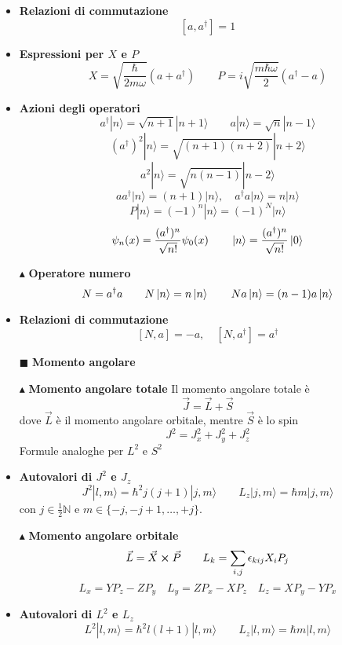 \documentclass{book}
\newcommand{\g}{\textbf}
\newcommand{\e}{\begin{equation}}
\newcommand{\ex}{\end{equation} }
\renewcommand{\it}{\item[$\cdot$]}
\begin{document}
\begin{multicols}{4}
\begin{itemize}
    \it \g{Relazioni di commutazione}
        \e{[a, a^\dagger] = 1} \ex

    \it \g{Espressioni per $X$ e $P$}
        \e{X = \sqrt{\frac{\hbar}{2m\omega}} (a + a^\dagger) \qquad P = i{\sqrt{\frac{m \hbar \omega}{2}}} (a^\dagger - a)} \ex

    \it \g{Azioni degli operatori}
        \e{a^\dagger |n\rangle = \sqrt{n + 1} |n + 1\rangle \qquad a |n\rangle = \sqrt{n} |n - 1\rangle} \ex
        \e{(a^\dagger)^2 |n\rangle = \sqrt{(n + 1)(n + 2)} |n + 2\rangle }\ex
        \e{a^2 |n\rangle = \sqrt{n(n - 1)} |n - 2\rangle} \ex
        \e{a a^\dagger |n\rangle = (n + 1) |n\rangle, \quad a^\dagger a |n\rangle = n |n\rangle} \ex
        \e{P |n\rangle = (-1)^n |n\rangle = (-1)^N |n\rangle} \ex
        \e{\psi_n(x) = \frac{(a^\dagger)^n}{\sqrt{n!}} \psi_0(x) \qquad \ket{n} = \frac{(a^{\dagger})^{n}}{\sqrt{n!}}\ket{0}} \ex
\item [$\blacktriangle$] \g{Operatore numero}
        \e{N = a^\dagger a \qquad N\ket{n} = n\ket{n} \qquad N a \ket{n} = (n-1)a\ket{n}}\ex
    \it \g{Relazioni di commutazione}
        \e{[N, a] = -a, \quad [N, a^\dagger] = a^\dagger} \ex
    
\item [$\blacksquare$] \g{Momento angolare}
\item [$\blacktriangle$] \g{Momento angolare totale}
        Il momento angolare totale è
        \e{\vec{J} = \vec{L} + \vec{S}}\ex
            dove $\vec{L}$ è il momento angolare orbitale, mentre $\vec{S}$ è lo spin
        \e{{J}^{2} = J^{2}_{x} + J^{2}_{y} + J^{2}_{z}}\ex
        Formule analoghe per $L^{2}$ e $S^{2}$
         \it \g{Autovalori di $J^2$ e $J_z$}
    \e{J^2 |l, m\rangle = \hbar^2 j(j + 1) |j, m\rangle \qquad L_z |j, m\rangle = \hbar m |j, m\rangle} \ex
      con $j \in \frac{1}{2} \mathbb{N}$ e $m \in \{-j, -j + 1, \dots, +j\}$.
    \item [$\blacktriangle$] \g{Momento angolare orbitale}
        \e{\vec{L} = \vec{X} \cross \vec{P} \qquad L_k = \sum_{i,j}\epsilon_{kij} X_i P_j} \ex
    \e{L_{x} = YP_{z} - ZP_{y} \quad L_{y} = ZP_{x} - XP_{z} \quad L_{z} = XP_{y} - YP_{x}}\ex
    \it \g{Autovalori di $L^2$ e $L_z$}
    \e{L^2 |l, m\rangle = \hbar^2 l(l + 1) |l, m\rangle \qquad L_z |l, m\rangle = \hbar m |l, m\rangle} \ex


\end{itemize}
\end{multicols}
\end{document}
